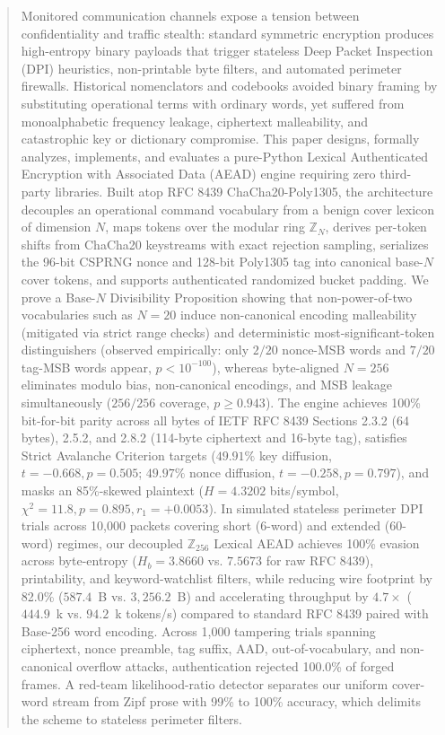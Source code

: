 \documentclass[conference]{IEEEtran}
\begin{document}
\begin{abstract}
Monitored communication channels expose a tension between confidentiality and traffic stealth: standard symmetric encryption produces high-entropy binary payloads that trigger stateless Deep Packet Inspection (DPI) heuristics, non-printable byte filters, and automated perimeter firewalls. Historical nomenclators and codebooks avoided binary framing by substituting operational terms with ordinary words, yet suffered from monoalphabetic frequency leakage, ciphertext malleability, and catastrophic key or dictionary compromise. This paper designs, formally analyzes, implements, and evaluates a pure-Python Lexical Authenticated Encryption with Associated Data (AEAD) engine requiring zero third-party libraries. Built atop RFC 8439 ChaCha20-Poly1305, the architecture decouples an operational command vocabulary from a benign cover lexicon of dimension $N$, maps tokens over the modular ring $\mathbb{Z}_N$, derives per-token shifts from ChaCha20 keystreams with exact rejection sampling, serializes the 96-bit CSPRNG nonce and 128-bit Poly1305 tag into canonical base-$N$ cover tokens, and supports authenticated randomized bucket padding. We prove a Base-$N$ Divisibility Proposition showing that non-power-of-two vocabularies such as $N=20$ induce non-canonical encoding malleability (mitigated via strict range checks) and deterministic most-significant-token distinguishers (observed empirically: only $2/20$ nonce-MSB words and $7/20$ tag-MSB words appear, $p < 10^{-100}$), whereas byte-aligned $N=256$ eliminates modulo bias, non-canonical encodings, and MSB leakage simultaneously ($256/256$ coverage, $p \ge 0.943$). The engine achieves 100\% bit-for-bit parity across all bytes of IETF RFC 8439 Sections 2.3.2 (64 bytes), 2.5.2, and 2.8.2 (114-byte ciphertext and 16-byte tag), satisfies Strict Avalanche Criterion targets ($49.91\%$ key diffusion, $t=-0.668, p=0.505$; $49.97\%$ nonce diffusion, $t=-0.258, p=0.797$), and masks an 85\%-skewed plaintext ($H=4.3202$ bits/symbol, $\chi^2=11.8, p=0.895, r_1=+0.0053$). In simulated stateless perimeter DPI trials across 10,000 packets covering short (6-word) and extended (60-word) regimes, our decoupled $\mathbb{Z}_{256}$ Lexical AEAD achieves 100\% evasion across byte-entropy ($H_b = 3.8660$ vs. $7.5673$ for raw RFC 8439), printability, and keyword-watchlist filters, while reducing wire footprint by 82.0\% ($587.4$~B vs. $3,256.2$~B) and accelerating throughput by $4.7\times$ ($444.9$~k vs. $94.2$~k tokens/s) compared to standard RFC 8439 paired with Base-256 word encoding. Across 1,000 tampering trials spanning ciphertext, nonce preamble, tag suffix, AAD, out-of-vocabulary, and non-canonical overflow attacks, authentication rejected 100.0\% of forged frames. A red-team likelihood-ratio detector separates our uniform cover-word stream from Zipf prose with 99\% to 100\% accuracy, which delimits the scheme to stateless perimeter filters.
\end{abstract}
\end{document}
